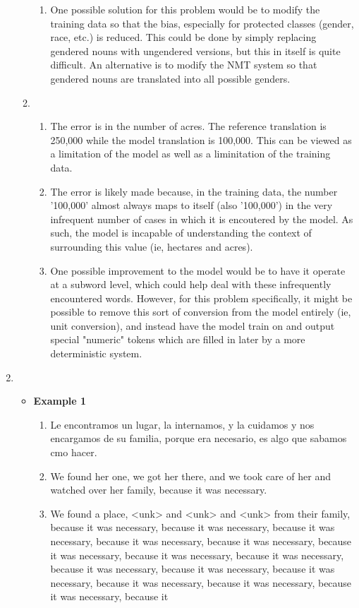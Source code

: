 \documentclass[12pt]{article}
\begin{document}
\begin{enumerate}[label=(\alph*)]
\begin{enumerate}[label=\roman*]
\begin{enumerate}[label=\arabic*]
          \item One possible solution for this problem would be to modify the training data so that the bias, especially for protected classes (gender, race, etc.) is reduced. This could be done by simply replacing gendered nouns with ungendered versions, but this in itself is quite difficult. An alternative is to modify the NMT system so that gendered nouns are translated into all possible genders.
        \end{enumerate}
      \item 
        \begin{enumerate}[label=\arabic*]
          \item The error is in the number of acres. The reference translation is 250,000 while the model translation is 100,000. This can be viewed as a limitation of the model as well as a liminitation of the training data.
          \item The error is likely made because, in the training data, the number '100,000' almost always maps to itself (also '100,000') in the very infrequent number of cases in which it is encoutered by the model. As such, the model is incapable of understanding the context of surrounding this value (ie, hectares and acres).
          \item One possible improvement to the model would be to have it operate at a subword level, which could help deal with these infrequently encountered words. However, for this problem specifically, it might be possible to remove this sort of conversion from the model entirely (ie, unit conversion), and instead have the model train on and output special "numeric" tokens which are filled in later by a more deterministic system.
        \end{enumerate}
    \end{enumerate}
  \item 
    \begin{itemize}
      \item \textbf{Example 1}
        \begin{enumerate}[label=\arabic*]
          \item Le encontramos un lugar, la internamos, y la cuidamos y nos encargamos de su familia, porque era necesario,
es algo que sabamos cmo hacer.
          \item We found her one, we got her there,  and we took care of her  and watched over her family,  because it was necessary.
          \item We found a place, <unk> and <unk> and <unk> from their family, because it was necessary, because it was necessary, because it was necessary, because it was necessary, because it was necessary, because it was necessary, because it was necessary, because it was necessary, because it was necessary, because it was necessary, because it was necessary, because it was necessary, because it was necessary, because it was necessary, because it

\end{enumerate}
\end{itemize}
\end{enumerate}
\end{document}
